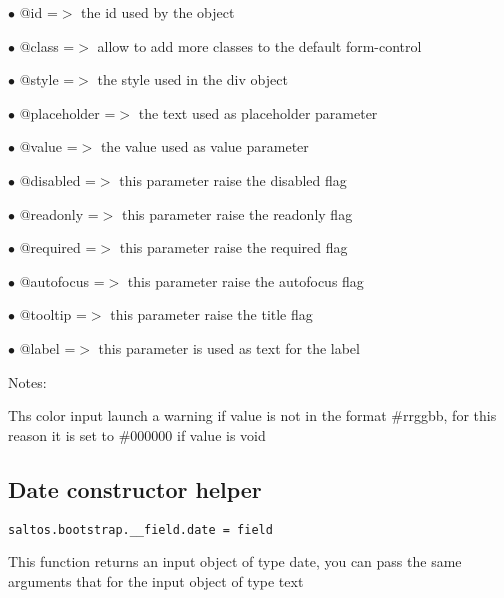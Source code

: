 \documentclass[a4paper]{book}
\begin{document}
\begin{compactitem}
\item[\color{myblue}$\bullet$] @id          =$>$ the id used by the object
\item[\color{myblue}$\bullet$] @class       =$>$ allow to add more classes to the default form-control
\item[\color{myblue}$\bullet$] @style       =$>$ the style used in the div object
\item[\color{myblue}$\bullet$] @placeholder =$>$ the text used as placeholder parameter
\item[\color{myblue}$\bullet$] @value       =$>$ the value used as value parameter
\item[\color{myblue}$\bullet$] @disabled    =$>$ this parameter raise the disabled flag
\item[\color{myblue}$\bullet$] @readonly    =$>$ this parameter raise the readonly flag
\item[\color{myblue}$\bullet$] @required    =$>$ this parameter raise the required flag
\item[\color{myblue}$\bullet$] @autofocus   =$>$ this parameter raise the autofocus flag
\item[\color{myblue}$\bullet$] @tooltip     =$>$ this parameter raise the title flag
\item[\color{myblue}$\bullet$] @label       =$>$ this parameter is used as text for the label
\end{compactitem}

Notes:

Ths color input launch a warning if value is not in the format \#rrggbb,
for this reason it is set to \#000000 if value is void

\hypertarget{toc440}{}
\subsection{Date constructor helper}

\begin{lstlisting}
saltos.bootstrap.__field.date = field
\end{lstlisting}

This function returns an input object of type date, you can pass the same arguments
that for the input object of type text
\end{document}
